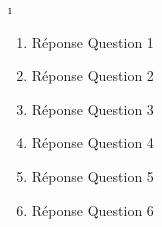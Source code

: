\begin {corrige}[\thechapter ]{\i }
\begin{enumerate}
\item Réponse Question 1
\item Réponse Question 2
\item Réponse Question 3
\item Réponse Question 4
\item Réponse Question 5
\item Réponse Question 6
\end{enumerate}
\end {corrige}\par \vspace *{\spacebeforeexo }
